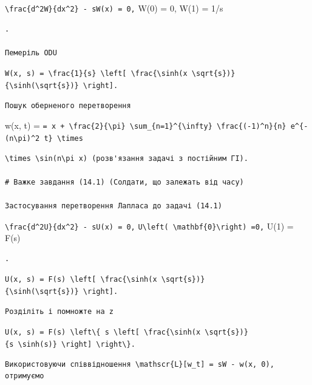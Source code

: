 \documentclass[
  ukrainian,
]{article}
\begin{document}
\texttt{\textbackslash{}frac\{d\^{}2W\}\{dx\^{}2\}\ -\ sW(x)\ =\ 0,}
W(0) = 0, W(1) = 1/s

\begin{verbatim}
.

Пемеріль ODU
\end{verbatim}

\texttt{W(x,\ s)\ =\ \textbackslash{}frac\{1\}\{s\}\ \textbackslash{}left{[}\ \textbackslash{}frac\{\textbackslash{}sinh(x\ \textbackslash{}sqrt\{s\})\}\{\textbackslash{}sinh(\textbackslash{}sqrt\{s\})\}\ \textbackslash{}right{]}.}

\begin{verbatim}
Пошук оберненого перетворення
\end{verbatim}

w(x, t) =
\texttt{=\ x\ +\ \textbackslash{}frac\{2\}\{\textbackslash{}pi\}\ \textbackslash{}sum\_\{n=1\}\^{}\{\textbackslash{}infty\}\ \textbackslash{}frac\{(-1)\^{}n\}\{n\}\ e\^{}\{-(n\textbackslash{}pi)\^{}2\ t\}\ \textbackslash{}times}

\begin{verbatim}
\times \sin(n\pi x) (розв'язання задачі з постійним ГІ).

# Важке завдання (14.1) (Солдати, що залежать від часу)

Застосування перетворення Лапласа до задачі (14.1)
\end{verbatim}

\texttt{\textbackslash{}frac\{d\^{}2U\}\{dx\^{}2\}\ -\ sU(x)\ =\ 0,}
\texttt{U\textbackslash{}left(\ \textbackslash{}mathbf\{0\}\textbackslash{}right)\ =0,}
U(1) = F(s)

\begin{verbatim}
.
\end{verbatim}

\texttt{U(x,\ s)\ =\ F(s)\ \textbackslash{}left{[}\ \textbackslash{}frac\{\textbackslash{}sinh(x\ \textbackslash{}sqrt\{s\})\}\{\textbackslash{}sinh(\textbackslash{}sqrt\{s\})\}\ \textbackslash{}right{]}.}

\begin{verbatim}
Розділіть і помножте на z
\end{verbatim}

\texttt{U(x,\ s)\ =\ F(s)\ \textbackslash{}left\textbackslash{}\{\ s\ \textbackslash{}left{[}\ \textbackslash{}frac\{\textbackslash{}sinh(x\ \textbackslash{}sqrt\{s\})\}\{s\ \textbackslash{}sinh(s)\}\ \textbackslash{}right{]}\ \textbackslash{}right\textbackslash{}\}.}

\begin{verbatim}
Використовуючи співвідношення \mathscr{L}[w_t] = sW - w(x, 0), отримуємо
\end{verbatim}
\end{document}

